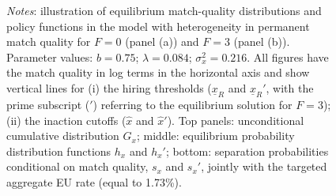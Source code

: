 \documentclass[12pt]{article} %
\theoremstyle{plain}
\theoremstyle{definition}
\begin{document}
\begin{figure}[!h]
	\caption*{\footnotesize \textit{Notes}: illustration of equilibrium match-quality distributions and policy functions in the model with heterogeneity in permanent match quality for $F=0$ (panel (a)) and $F=3$ (panel (b)). Parameter values: $b = 0.75$; $\lambda = 0.084$; $\sigma_x^2 = 0.216$. All figures have the match quality in log terms in the horizontal axis and show vertical lines for (i) the hiring thresholds ($\underline{x}_R$ and $\underline{x}_R'$, with the prime subscript ($'$) referring to the equilibrium solution for $F=3$); (ii) the inaction cutoffs ($\hat{x}$ and $\hat{x}'$). Top panels: unconditional cumulative distribution $G_x$; middle: equilibrium probability distribution functions $h_x$ and $h_x'$; bottom: separation probabilities conditional on match quality, $s_x$ and $s_x'$, jointly with the targeted aggregate EU rate (equal to 1.73\%).}
	\label{fig:fig_2}
	\end{figure}
\end{document}
